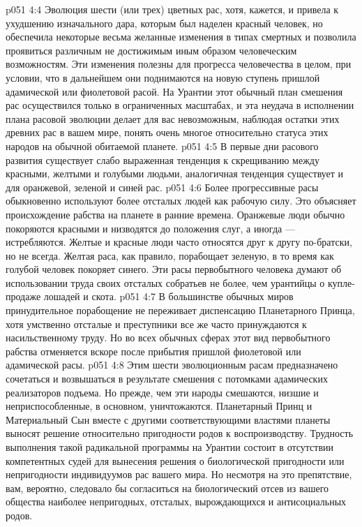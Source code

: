 \vs p051 4:4 Эволюция шести (или трех) цветных рас, хотя, кажется, и привела к ухудшению изначального дара, которым был наделен красный человек, но обеспечила некоторые весьма желанные изменения в типах смертных и позволила проявиться различным не достижимым иным образом человеческим возможностям. Эти изменения полезны для прогресса человечества в целом, при условии, что в дальнейшем они поднимаются на новую ступень пришлой адамической или фиолетовой расой. На Урантии этот обычный план смешения рас осуществился только в ограниченных масштабах, и эта неудача в исполнении плана расовой эволюции делает для вас невозможным, наблюдая остатки этих древних рас в вашем мире, понять очень многое относительно статуса этих народов на обычной обитаемой планете.
\vs p051 4:5 \pc В первые дни расового развития существует слабо выраженная тенденция к скрещиванию между красными, желтыми и голубыми людьми, аналогичная тенденция существует и для оранжевой, зеленой и синей рас.
\vs p051 4:6 Более прогрессивные расы обыкновенно используют более отсталых людей как рабочую силу. Это объясняет происхождение рабства на планете в ранние времена. Оранжевые люди обычно покоряются красными и низводятся до положения слуг, а иногда --- истребляются. Желтые и красные люди часто относятся друг к другу по\hyp{}братски, но не всегда. Желтая раса, как правило, порабощает зеленую, в то время как голубой человек покоряет синего. Эти расы первобытного человека думают об использовании труда своих отсталых собратьев не более, чем урантийцы о купле\hyp{}продаже лошадей и скота.
\vs p051 4:7 В большинстве обычных миров принудительное порабощение не переживает диспенсацию Планетарного Принца, хотя умственно отсталые и преступники все же часто принуждаются к насильственному труду. Но во всех обычных сферах этот вид первобытного рабства отменяется вскоре после прибытия пришлой фиолетовой или адамической расы.
\vs p051 4:8 Этим шести эволюционным расам предназначено сочетаться и возвышаться в результате смешения с потомками адамических реализаторов подъема. Но прежде, чем эти народы смешаются, низшие и неприспособленные, в основном, уничтожаются. Планетарный Принц и Материальный Сын вместе с другими соответствующими властями планеты выносят решение относительно пригодности родов к воспроизводству. Трудность выполнения такой радикальной программы на Урантии состоит в отсутствии компетентных судей для вынесения решения о биологической пригодности или непригодности индивидуумов рас вашего мира. Но несмотря на это препятствие, вам, вероятно, следовало бы согласиться на биологический отсев из вашего общества наиболее непригодных, отсталых, вырождающихся и антисоциальных родов.
